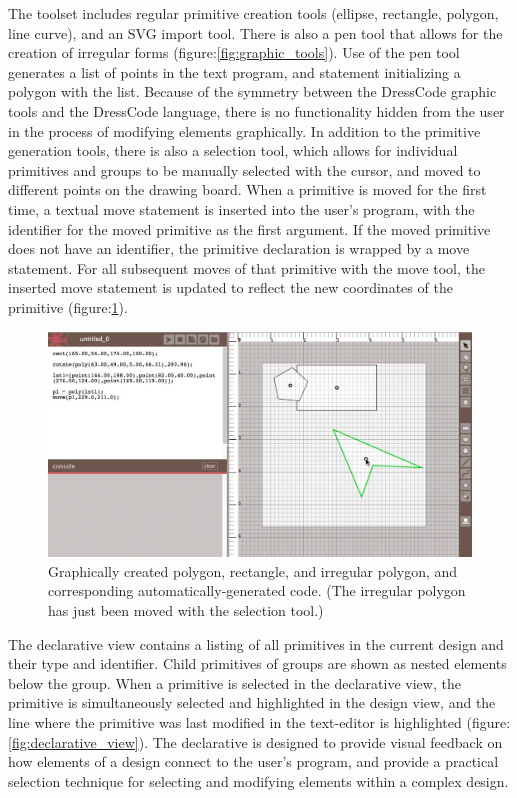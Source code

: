 \documentclass{sigchi}
\begin{document}
The toolset includes regular primitive creation tools (ellipse, rectangle, polygon, line curve), and an SVG import tool. There is also a pen tool that allows for the creation of irregular forms (figure:\ref{fig:graphic_tools}). Use of the pen tool generates a list of points in the text program, and statement initializing a polygon with the list. Because of the symmetry between the DressCode graphic tools and the DressCode language, there is no functionality hidden from the user in the process of modifying elements graphically. In addition to the primitive generation tools, there is also a selection tool, which allows for individual primitives and groups to be manually selected with the cursor, and moved to different points on the drawing board. When a primitive is moved for the first time, a textual move statement is inserted into the user's program, with the identifier for the moved primitive as the first argument. If the moved primitive does not have an identifier, the primitive declaration is wrapped by a move statement. For all subsequent moves of that primitive with the move tool, the inserted move statement is updated to reflect the new coordinates of the primitive (figure:\ref{fig:auto_generated_code}).

\begin{center}
\begin{figure}[h!]
\includegraphics[width=\columnwidth]{images/auto_generated_code.jpg}
\caption{Graphically created polygon, rectangle, and irregular polygon, and corresponding automatically-generated code. (The irregular polygon has just been moved with the selection tool.)}
\label{fig:auto_generated_code}
\end{figure}
\end{center}
\vspace{-20pt}

The declarative view contains a listing of all primitives in the current design and their type and identifier. Child primitives of groups are shown as nested elements below the group. When a primitive is selected in the declarative view, the primitive is simultaneously selected and highlighted in the design view, and the line where the primitive was last modified in the text-editor is highlighted (figure:\ref{fig:declarative_view}). The declarative is designed to provide visual feedback on how elements of a design connect to the user's program, and provide a practical selection technique for selecting and modifying elements within a complex design.
\end{document}
